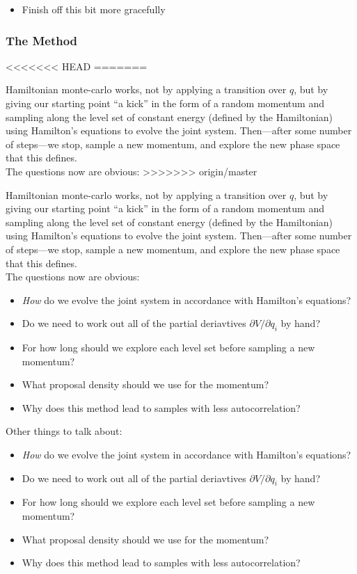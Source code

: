 \documentclass{article}
\begin{document}
\begin{itemize}
  \item Finish off this bit more gracefully
\end{itemize}

\subsubsection{The Method}
<<<<<<< HEAD
=======

Hamiltonian monte-carlo works, not by applying a transition over $q$, but by giving our starting point ``a kick'' in the form of a random momentum and sampling along the level set of constant energy (defined by the Hamiltonian) using Hamilton's equations to evolve the joint system. Then---after some number of steps---we stop, sample a new momentum, and explore the new phase space that this defines. \\

The questions now are obvious:
>>>>>>> origin/master

Hamiltonian monte-carlo works, not by applying a transition over $q$, but by giving our starting point ``a kick'' in the form of a random momentum and sampling along the level set of constant energy (defined by the Hamiltonian) using Hamilton's equations to evolve the joint system. Then---after some number of steps---we stop, sample a new momentum, and explore the new phase space that this defines. \\

The questions now are obvious:

\begin{itemize}
\item \emph{How} do we evolve the joint system in accordance with Hamilton's equations?
\item Do we need to work out all of the partial deriavtives $\partial V/\partial q_i$ by hand? 
\item For how long should we explore each level set before sampling a new momentum?
\item What proposal density should we use for the momentum?
\item Why does this method lead to samples with less autocorrelation?
\end{itemize}

Other things to talk about:
\begin{itemize}
\item \emph{How} do we evolve the joint system in accordance with Hamilton's equations?
\item Do we need to work out all of the partial deriavtives $\partial V/\partial q_i$ by hand? 
\item For how long should we explore each level set before sampling a new momentum?
\item What proposal density should we use for the momentum?
\item Why does this method lead to samples with less autocorrelation?
\end{itemize}
\end{document}

